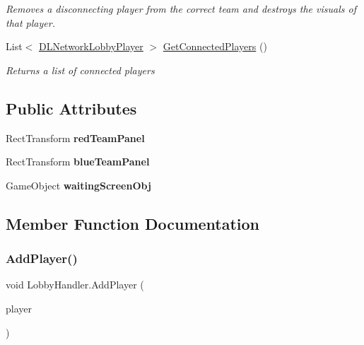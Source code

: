 \begin{DoxyCompactItemize}
\begin{DoxyCompactList}\small\item\em Removes a disconnecting player from the correct team and destroys the visuals of that player. \end{DoxyCompactList}\item 
List$<$ \hyperlink{class_d_l_network_lobby_player}{D\+L\+Network\+Lobby\+Player} $>$ \hyperlink{class_lobby_handler_ac928e312ab0287895f609e3f1785602c}{Get\+Connected\+Players} ()
\begin{DoxyCompactList}\small\item\em Returns a list of connected players \end{DoxyCompactList}\end{DoxyCompactItemize}
\subsection*{Public Attributes}
\begin{DoxyCompactItemize}
\item 
\hypertarget{class_lobby_handler_a8c1fd60ff77f3483237ab111ce9bdd54}{}\label{class_lobby_handler_a8c1fd60ff77f3483237ab111ce9bdd54} 
Rect\+Transform {\bfseries red\+Team\+Panel}
\item 
\hypertarget{class_lobby_handler_a7e155e5d1e5543726129c85aeb8955fd}{}\label{class_lobby_handler_a7e155e5d1e5543726129c85aeb8955fd} 
Rect\+Transform {\bfseries blue\+Team\+Panel}
\item 
\hypertarget{class_lobby_handler_ad539563e57aa10019272581b7e17ca9a}{}\label{class_lobby_handler_ad539563e57aa10019272581b7e17ca9a} 
Game\+Object {\bfseries waiting\+Screen\+Obj}
\end{DoxyCompactItemize}


\subsection{Member Function Documentation}
\hypertarget{class_lobby_handler_ad86ccc3fc2d147aedddd75c5df056c5c}{}\label{class_lobby_handler_ad86ccc3fc2d147aedddd75c5df056c5c} 
\subsubsection{\texorpdfstring{Add\+Player()}{AddPlayer()}}
{\footnotesize\ttfamily void Lobby\+Handler.\+Add\+Player (\begin{DoxyParamCaption}\item[{\hyperlink{class_d_l_network_lobby_player}{D\+L\+Network\+Lobby\+Player}}]{player }\end{DoxyParamCaption})}



